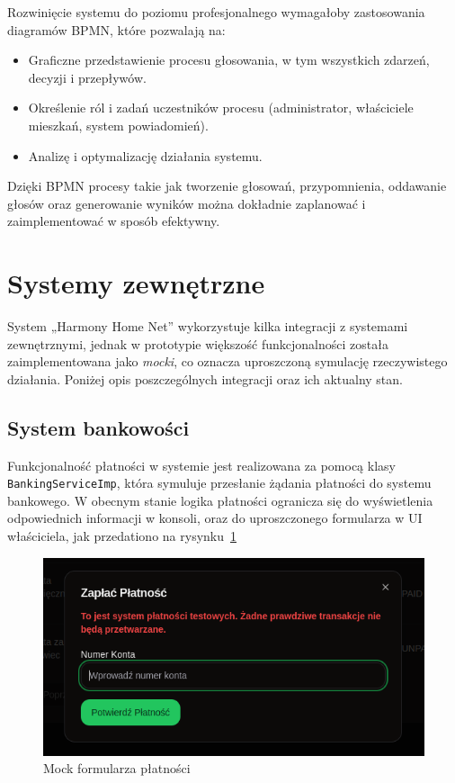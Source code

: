 Rozwinięcie systemu do poziomu profesjonalnego wymagałoby zastosowania diagramów BPMN, które pozwalają na:
\begin{itemize}
    \item Graficzne przedstawienie procesu głosowania, w tym wszystkich zdarzeń, decyzji i przepływów.
    \item Określenie ról i zadań uczestników procesu (administrator, właściciele mieszkań, system powiadomień).
    \item Analizę i optymalizację działania systemu.
\end{itemize}

Dzięki BPMN procesy takie jak tworzenie głosowań, przypomnienia, oddawanie głosów oraz generowanie wyników można dokładnie zaplanować i zaimplementować w sposób efektywny.


\section{Systemy zewnętrzne}

System „Harmony Home Net” wykorzystuje kilka integracji z systemami zewnętrznymi, jednak w prototypie większość funkcjonalności została zaimplementowana jako \emph{mocki}, co oznacza uproszczoną symulację rzeczywistego działania. Poniżej opis poszczególnych integracji oraz ich aktualny stan.

\subsection{System bankowości}

Funkcjonalność płatności w systemie jest realizowana za pomocą klasy \texttt{BankingServiceImp}, która symuluje przesłanie żądania płatności do systemu bankowego. W obecnym stanie logika płatności ogranicza się do wyświetlenia odpowiednich informacji w konsoli, oraz do uproszczonego formularza w UI właściciela, jak przedationo na rysynku~\ref{fig:mock_of_paymet}

\begin{figure}[ht]
    \centering
    \includegraphics[width=0.63\linewidth]{rys03/mock_pay}
    \caption{Mock formularza płatności}
    \label{fig:mock_of_paymet}
\end{figure}

